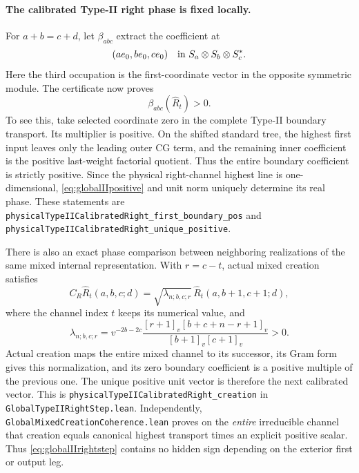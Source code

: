 \documentclass[10pt,a4paper]{article}
\newcommand{\lean}[1]{{\small\nolinkurl{#1}}}
\newenvironment{revision}{\begingroup}{\endgroup}
\begin{document}
\begin{revision}
\paragraph{The calibrated Type-II right phase is fixed locally.}
For $a+b=c+d$, let $\beta_{abc}$ extract the coefficient at
\[
 (a e_0,b e_0,c e_0)
 \quad\hbox{in }S_a\otimes S_b\otimes S_c^*.
\]
Here the third occupation is the first-coordinate vector in the
opposite symmetric module. The certificate now proves
\begin{equation}\label{eq:globalIIpositive}
 \beta_{abc}(\widehat R_t)>0.
\end{equation}
To see this, take selected coordinate zero in the complete Type-II
boundary transport. Its multiplier is positive. On the shifted
standard tree, the highest first input leaves only the leading outer
CG term, and the remaining inner coefficient is the positive
last-weight factorial quotient. Thus the entire boundary coefficient
is strictly positive. Since the physical right-channel highest line is one-dimensional,
\eqref{eq:globalIIpositive} and unit norm uniquely determine its real
phase. These statements are
\lean{physicalTypeIICalibratedRight_first_boundary_pos} and
\lean{physicalTypeIICalibratedRight_unique_positive}.

There is also an exact phase comparison between neighboring
realizations of the same mixed internal representation. With
$r=c-t$, actual mixed creation satisfies
\begin{equation}\label{eq:globalIIrightstep}
 C_R\widehat R_t(a,b,c;d)=
 \sqrt{\lambda_{n;b,c;r}}\,
 \widehat R_t(a,b+1,c+1;d),
\end{equation}
where the channel index $t$ keeps its numerical value, and
\[
 \lambda_{n;b,c;r}=
 v^{-2b-2c}\frac{[r+1]_v[b+c+n-r+1]_v}
 {[b+1]_v[c+1]_v}>0.
\]
Actual creation maps the entire mixed channel to its successor, its
Gram form gives this normalization, and its zero boundary coefficient
is a positive multiple of the previous one. The unique positive unit
vector is therefore the next calibrated vector. This is
\lean{physicalTypeIICalibratedRight_creation} in
\lean{GlobalTypeIIRightStep.lean}. Independently,
\lean{GlobalMixedCreationCoherence.lean} proves on the \emph{entire}
irreducible channel that creation equals canonical highest transport
times an explicit positive scalar. Thus \eqref{eq:globalIIrightstep}
contains no hidden sign depending on the exterior first or output leg.


\end{revision}
\end{document}
